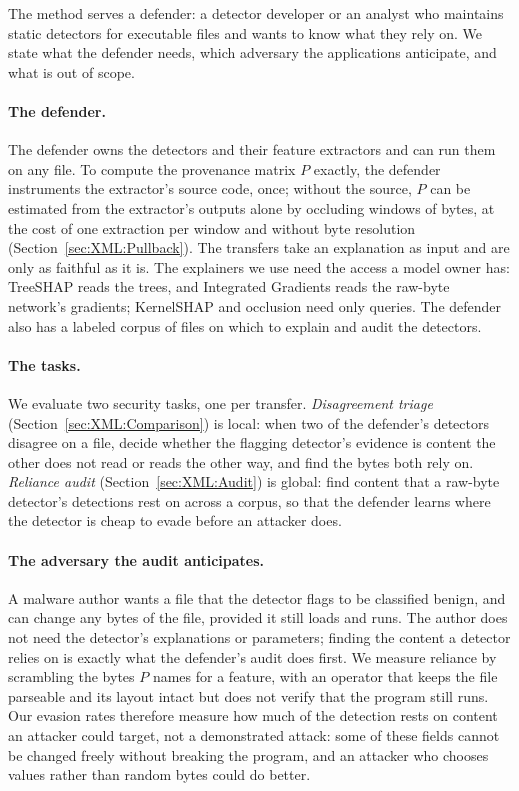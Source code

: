 The method serves a defender: a detector developer or an analyst who maintains static detectors for executable
files and wants to know what they rely on. We state what the defender needs, which adversary the applications
anticipate, and what is out of scope.

\paragraph{The defender.} The defender owns the detectors and their feature extractors and can run them on any file.
To compute the provenance matrix $P$ exactly, the defender instruments the extractor's source code, once; without the
source, $P$ can be estimated from the extractor's outputs alone by occluding windows of bytes, at the cost of
one extraction per window and without byte resolution (Section~\ref{sec:XML:Pullback}). The transfers take an explanation as input and are only as
faithful as it is. The explainers we use need the access a model owner has: TreeSHAP reads the trees, and Integrated
Gradients reads the raw-byte network's gradients; KernelSHAP and occlusion need only queries. The defender also has
a labeled corpus of files on which to explain and audit the detectors.

\paragraph{The tasks.} We evaluate two security tasks, one per transfer. \textit{Disagreement triage}
(Section~\ref{sec:XML:Comparison}) is local: when two of the defender's detectors disagree on a file, decide whether
the flagging detector's evidence is content the other does not read or reads the other way, and find the bytes both
rely on. \textit{Reliance audit} (Section~\ref{sec:XML:Audit}) is global: find content that a raw-byte detector's
detections rest on across a corpus, so that the defender learns where the detector is cheap to evade before an
attacker does.

\paragraph{The adversary the audit anticipates.} A malware author wants a file that the detector flags to be
classified benign, and can change any bytes of the file, provided it still loads and runs. The author does not need
the detector's explanations or parameters; finding the content a detector relies on is exactly what the defender's
audit does first. We measure reliance by scrambling the bytes $P$ names for a feature, with an operator that keeps the
file parseable and its layout intact but does not verify that the program still runs. Our evasion rates therefore
measure how much of the detection rests on content an attacker could target, not a demonstrated attack: some of these
fields cannot be changed freely without breaking the program, and an attacker who chooses values rather than random
bytes could do better.

